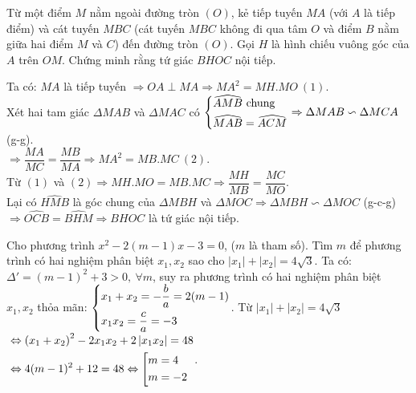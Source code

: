 \begin{ex}%
	Từ một điểm $M$  nằm ngoài đường tròn $(O)$, kẻ tiếp tuyến $MA$ (với $A$ là tiếp điểm) và cát tuyến $MBC$ (cát tuyến $MBC$ không đi qua tâm $O$ và điểm $B$ nằm giữa hai điểm $M$ và $C$) đến đường tròn $(O)$. Gọi $H$ là hình chiếu vuông góc của $A$ trên $OM$. Chứng minh rằng tứ giác $BHOC$ nội tiếp.
\loigiai
    {\begin{center}
    \end{center}
    Ta có: $MA$ là tiếp tuyến $\Rightarrow OA\perp MA\Rightarrow MA^2=MH.MO \ (1)$.\\
    Xét hai tam giác $\Delta MAB$ và $\Delta MAC$ có $\left\{\begin{aligned}&\widehat{AMB} \text{ chung}\\& \widehat{MAB}=\widehat{ACM}\end{aligned}\right.\Rightarrow \Delta MAB\backsim\Delta MCA$ (g-g).\\
    $\Rightarrow \dfrac{MA}{MC}=\dfrac{MB}{MA}\Rightarrow MA^2=MB.MC \ (2)$.\\
    Từ $(1)$ và $(2)\Rightarrow MH.MO=MB.MC\Rightarrow \dfrac{MH}{MB}=\dfrac{MC}{MO}$.\\
    Lại có $\widehat{HMB}$ là góc chung của $\Delta MBH$ và $\Delta MOC\Rightarrow \Delta MBH\backsim\Delta MOC$ (g-c-g) \\
    $\Rightarrow \widehat{OCB}=\widehat{BHM}\Rightarrow BHOC$ là tứ giác nội tiếp.
    }
\end{ex}
\begin{ex}%
	Cho phương trình $x^2-2(m-1)x-3=0$, ($m$ là tham số). Tìm $m$ để phương trình có hai nghiệm phân biệt $x_1,x_2$ sao cho $\left|x_1\right|+\left|x_2\right|=4\sqrt{3}$.
\loigiai
    {Ta có: $\Delta '=(m-1)^2+3>0,\ \forall m$, suy ra phương trình có hai nghiệm phân biệt $x_1,x_2$ thỏa mãn:
    $\left\{\begin{aligned}&x_1+x_2=-\dfrac{b}{a}=2(m-1)\\&x_1x_2=\dfrac{c}{a}=-3\end{aligned}\right.$.
    Từ $\left|x_1\right|+\left|x_2\right|=4\sqrt{3}$\\
    $\begin{aligned}
       &\Leftrightarrow \left(x_1+x_2\right)^2-2x_1x_2+2\left|x_1x_2\right|=48\\
       &\Leftrightarrow 4(m-1)^2+12=48\Leftrightarrow \left[\begin{aligned}&m=4\\&m=-2\end{aligned}\right.
    \end{aligned}
 $.
    }
\end{ex}
